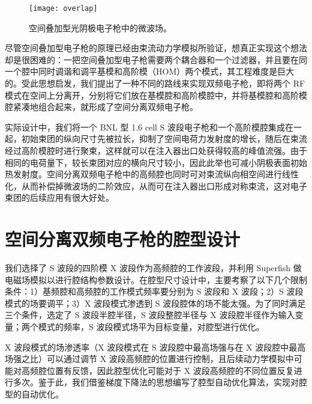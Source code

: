 \begin{figure}[htbp]
\centering
\texttt{[image: overlap]}
\caption{\label{fig:linearfield} 空间叠加型光阴极电子枪中的微波场。}
\end{figure}

尽管空间叠加型电子枪的原理已经由束流动力学模拟所验证，想真正实现这个想法却是很困难的：一把空间叠加型电子枪需要两个耦合器和一个过滤器，并且要在同一个腔中同时调谐和调平基模和高阶模（HOM）两个模式，其工程难度是巨大的。受此思想启发，我们提出了一种不同的路线来实现双频电子枪，即将两个 RF 模式在空间上分离开，分别将它们放在基模腔和高阶模腔中，并将基模腔和高阶模腔紧凑地组合起来，就形成了空间分离双频电子枪。

实际设计中，我们将一个 BNL 型 1.6 cell S 波段电子枪和一个高阶模腔集成在一起，初始束团的纵向尺寸先被拉长，抑制了空间电荷力发射度的增长，随后在束流经过高阶模腔时进行聚束，这样就可以在注入器出口处获得较高的峰值流强。由于相同的电荷量下，较长束团对应的横向尺寸较小，因此此举也可减小阴极表面初始热发射度。空间分离双频电子枪中的高频腔也同时可对束流纵向相空间进行线性化，从而补偿掉微波场的二阶效应，从而可在注入器出口形成对称束流，这对电子束团的后续应用有很大好处。

\section{空间分离双频电子枪的腔型设计}
我们选择了 S 波段的四阶模 X 波段作为高频腔的工作波段，并利用 Superfish 做电磁场模拟以进行腔结构参数设计。在腔型尺寸设计中，主要考察了以下几个限制条件：1）基频腔和高频腔的工作模式频率要分别为 S 波段和 X 波段；2）S 波段模式的场要调平；3）X 波段模式渗透到 S 波段腔体的场不能太强。为了同时满足三个条件，选定了 S 波段半腔半径，S 波段整腔半径与 X 波段腔半径作为输入变量；两个模式的频率，S 波段模式场平为目标变量，对腔型进行优化。

X 波段模式的场渗透率（X 波段模式在 S 波段腔中最高场强与在 X 波段腔中最高场强之比）可以通过调节 X 波段高频腔的位置进行控制，且后续动力学模拟中可能对高频腔位置有反馈，因此腔型优化可能对于 X 波段高频腔的不同位置反复进行多次。鉴于此，我们借鉴梯度下降法的思想编写了腔型自动优化算法，实现对腔型的自动优化。

